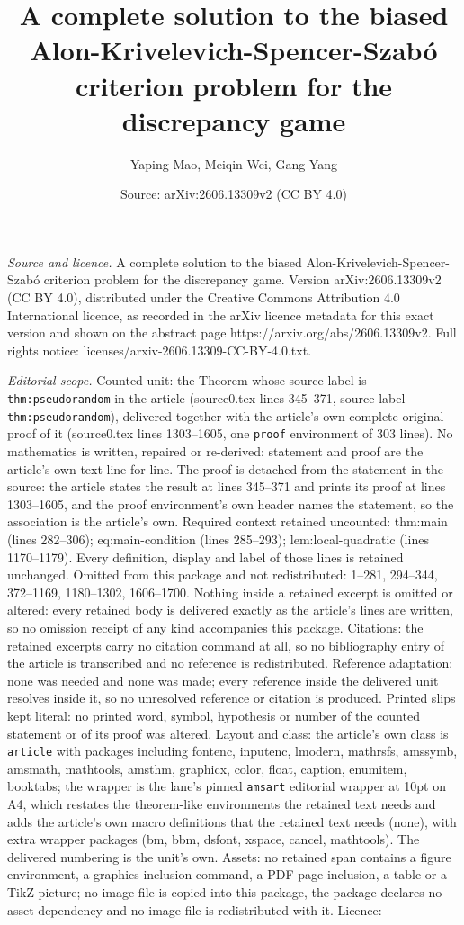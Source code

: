 \documentclass[10pt,a4paper]{amsart}
\title[A complete solution to the biased Alon-Krivelevich-Spencer-S]{A complete solution to the biased Alon-Krivelevich-Spencer-Szab\'o criterion problem for the discrepancy game}
\author{Yaping Mao, Meiqin Wei, Gang Yang}
\date{Source: arXiv:2606.13309v2 (CC BY 4.0)}
\begin{document}
\maketitle

\noindent\emph{Source and licence.} A complete solution to the biased Alon-Krivelevich-Spencer-Szab\'o criterion problem for the discrepancy game. Version arXiv:2606.13309v2 (CC BY 4.0), distributed under the Creative Commons Attribution 4.0 International licence, as recorded in the arXiv licence metadata for this exact version and shown on the abstract page https://arxiv.org/abs/2606.13309v2. Full rights notice: licenses/arxiv-2606.13309-CC-BY-4.0.txt.\par\smallskip

\noindent\textit{Editorial scope.} Counted unit: the Theorem whose source label is \texttt{thm:pseudorandom} in the article (source0.tex lines 345--371, source label \texttt{thm:pseudorandom}), delivered together with the article's own complete original proof of it (source0.tex lines 1303--1605, one \texttt{proof} environment of 303 lines). No mathematics is written, repaired or re-derived: statement and proof are the article's own text line for line. The proof is detached from the statement in the source: the article states the result at lines 345--371 and prints its proof at lines 1303--1605, and the proof environment's own header names the statement, so the association is the article's own. Required context retained uncounted: thm:main (lines 282--306); eq:main-condition (lines 285--293); lem:local-quadratic (lines 1170--1179). Every definition, display and label of those lines is retained unchanged. Omitted from this package and not redistributed: 1--281, 294--344, 372--1169, 1180--1302, 1606--1700. Nothing inside a retained excerpt is omitted or altered: every retained body is delivered exactly as the article's lines are written, so no omission receipt of any kind accompanies this package. Citations: the retained excerpts carry no citation command at all, so no bibliography entry of the article is transcribed and no reference is redistributed. Reference adaptation: none was needed and none was made; every reference inside the delivered unit resolves inside it, so no unresolved reference or citation is produced. Printed slips kept literal: no printed word, symbol, hypothesis or number of the counted statement or of its proof was altered. Layout and class: the article's own class is \texttt{article} with packages including fontenc, inputenc, lmodern, mathrsfs, amssymb, amsmath, mathtools, amsthm, graphicx, color, float, caption, enumitem, booktabs; the wrapper is the lane's pinned \texttt{amsart} editorial wrapper at 10pt on A4, which restates the theorem-like environments the retained text needs and adds the article's own macro definitions that the retained text needs (none), with extra wrapper packages (bm, bbm, dsfont, xspace, cancel, mathtools). The delivered numbering is the unit's own. Assets: no retained span contains a figure environment, a graphics-inclusion command, a PDF-page inclusion, a table or a TikZ picture; no image file is copied into this package, the package declares no asset dependency and no image file is redistributed with it. Licence: 
\end{document}
